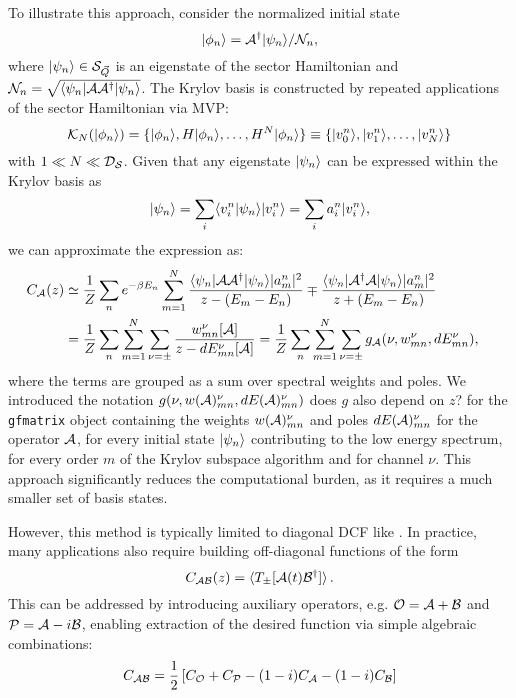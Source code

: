 \documentclass[edipack_sp.tex]{subfiles}
\begin{document}
To illustrate this approach, consider the normalized initial state
$$
\ket{\phi_n}=\AA^\dagger\ket{\psi_n}/\NN_n,
$$
where  $\ket{\psi_n}\in\SS_{\vec{Q}}$ is an eigenstate of the sector Hamiltonian and $\NN_n=\sqrt{\bra{\psi_n}\AA
  \AA^\dagger\ket{\psi_n}}$.
The Krylov basis is constructed by repeated applications of the sector Hamiltonian via MVP: 
$$
\mathcal{K}_{N} (\ket{\phi_n})=\{\ket{\phi_n}, H\ket{\phi_n}, \dots,
H^N\ket{\phi_n}\}\equiv \{\ket{v^n_0}, \ket{v^n_1},\dots, \ket{v^n_N}
\}
$$ 
with $1 \ll N \ll \DD_\SS$.
Given that any eigenstate $\ket{\psi_n}$ can be expressed within the Krylov basis as
$$
\ket{\psi_n} = \sum_i  \ibra v^n_i|\psi_n \iket  \ket{ v^n_i} =
\sum_i a^n_i \ket{v^n_i}, 
$$
we can approximate the expression  as:  
\begin{equation}
  \label{eqGKrylov}
  \begin{split}
    C_\AA(z)  &\simeq \frac{1}{Z}\sum_n e^{-\beta E_n}
    \sum_{m=1}^{N} \frac{\bra{\psi_n}\AA \AA^\dagger\ket{\psi_n} |a^n_m|^2}{
      z - (E_m-E_n)} \mp \frac{\bra{\psi_n}\AA^\dagger \AA\ket{\psi_n}
      |a^n_m|^2}{ z + (E_m-E_n)}\cr
    &= \frac{1}{Z}\sum_n\sum_{m=1}^{N} \sum_{\nu=\pm}\frac{w^{\nu}_{mn}[\AA]}{z - dE^\nu_{mn}[\AA]} 
    = \frac{1}{Z}\sum_n
    \sum_{m=1}^{N} \sum_{\nu=\pm} g_\AA(\nu, w^{\nu}_{mn},  dE^\nu_{mn}), \cr
  \end{split}
\end{equation}
where the terms are grouped as a sum over spectral weights and
poles. We introduced the notation $g(\nu, w(\AA)^{\nu}_{mn},  dE(\AA)^\nu_{mn})$ does $g$ also depend on $z$?
for the {\tt gfmatrix} object containing the weights $w(\AA)^{\nu}_{mn}$ and
poles $dE(\AA)^{\nu}_{mn}$ for the operator $\AA$, for every initial state $\ket{\psi_n}$
contributing to the low energy spectrum, for every order $m$ of the
Krylov subspace algorithm and for channel $\nu$.
This approach significantly reduces the computational burden, as it
requires a much smaller set of basis states.

However, this method is typically limited to diagonal DCF like
. In practice, many applications also require building off-diagonal
functions of the form
$$
C_{\AA\BB}(z) = \ibra T_{\pm}[\AA(t) \BB^\dagger]\iket\, .
$$
This can be addressed by introducing auxiliary operators, e.g.  $\OO=\AA +\BB$ and
$\PP=\AA-i\BB$, enabling extraction of the desired function via
simple algebraic combinations:
$$
C_{\AA\BB} = \frac{1}{2}\left[C_\OO + C_\PP - (1-i)C_\AA -(1-i)C_\BB\right]
$$
\end{document}
